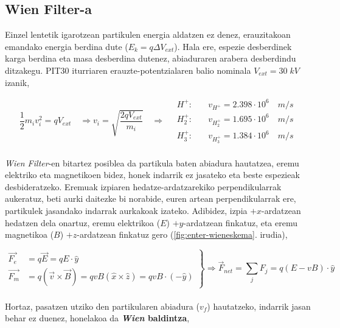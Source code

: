 \documentclass[12pt]{article}
\numberwithin{figure}{section}
\numberwithin{equation}{section}
\begin{document}
\subsection{Wien Filter-a}
Einzel lentetik igarotzean partikulen energia aldatzen ez denez, erauzitakoan emandako energia berdina dute ($E_k=q\Delta V_{ext}$). Hala ere, espezie desberdinek karga berdina eta masa desberdina dutenez, abiaduraren arabera desberdindu ditzakegu. PIT30 iturriaren erauzte-potentzialaren balio nominala $V_{ext}=30\;kV$ izanik,

\begin{equation}
    \frac{1}{2}m_iv_i^2=qV_{ext} \quad \Longrightarrow v_i =\sqrt{\frac{2qV_{ext}}{m_i}} \quad \Longrightarrow \quad \boxed{ \begin{aligned}
        H^+: \quad & v_{H^+}=\num{2.398}\cdot10^6\quad m/s\\
        H_2^+: \quad & v_{H_2^+}=\num{1.695}\cdot10^6\quad m/s \\
        H_3^+: \quad & v_{H_3^+}=\num{1.384}\cdot10^6\quad m/s
\end{aligned}
}
\end{equation}\\

\textit{Wien Filter}-en bitartez posiblea da partikula baten abiadura hautatzea, eremu elektriko eta magnetikoen bidez, honek indarrik ez jasateko eta beste espezieak desbideratzeko. Eremuak izpiaren hedatze-ardatzarekiko perpendikularrak aukeratuz, beti aurki daitezke bi norabide, euren artean perpendikularrak ere, partikulek jasandako indarrak aurkakoak izateko. Adibidez, izpia $+x$-ardatzean hedatzen dela onartuz, eremu elektrikoa ($E$) $+y$-ardatzean finkatuz, eta eremu magnetikoa ($B$) $+z$-ardatzean finkatuz gero (\ref{fig:enter-wieneskema}. irudia),

\begin{equation}
    \left.
    \begin{aligned}
        \vec{F_e}&=q\vec{E}=qE\cdot \hat{y} \\
        \vec{F_m}&=q (\vec{v}\times \vec{B})=qvB(\hat{x}\times \hat{z})=qvB\cdot(-\hat{y})
    \end{aligned}
    \right\}
     \Longrightarrow \vec{F}_{net}=\sum_j F_j=q(E-vB) \cdot \hat{y}
     \label{eq:prewien}
\end{equation}\\

Hortaz, pasatzen utziko den partikularen abiadura ($v_f$) hautatzeko, indarrik jasan behar ez duenez, honelakoa da \textbf{\textit{Wien} baldintza},
\end{document}
